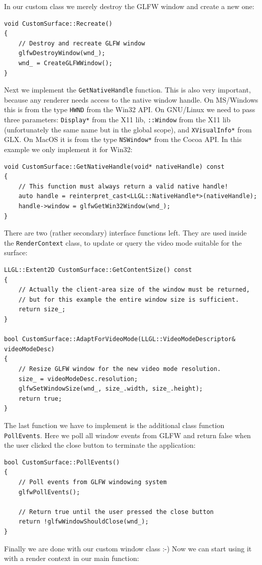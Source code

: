 \documentclass{article}
\begin{document}
In our custom class we merely destroy the GLFW window and create a new one:
\begin{lstlisting}
void CustomSurface::Recreate()
{
	// Destroy and recreate GLFW window
	glfwDestroyWindow(wnd_);
	wnd_ = CreateGLFWWindow();
}
\end{lstlisting}
Next we implement the \texttt{GetNativeHandle} function. This is also very important,
because any renderer needs access to the native window handle.
On MS/Windows this is from the type \texttt{HWND} from the Win32 API.
On GNU/Linux we need to pass three parameters: \texttt{Display*} from the X11 lib,
\texttt{::Window} from the X11 lib (unfortunately the same name but in the global scope),
and \texttt{XVisualInfo*} from GLX.
On MacOS it is from the type \texttt{NSWindow*} from the Cocoa API.
In this example we only implement it for Win32:
\begin{lstlisting}
void CustomSurface::GetNativeHandle(void* nativeHandle) const
{
	// This function must always return a valid native handle!
	auto handle = reinterpret_cast<LLGL::NativeHandle*>(nativeHandle);
	handle->window = glfwGetWin32Window(wnd_);
}
\end{lstlisting}
There are two (rather secondary) interface functions left.
They are used inside the \texttt{RenderContext} class, to update or query the video mode suitable for the surface:
\begin{lstlisting}
LLGL::Extent2D CustomSurface::GetContentSize() const
{
	// Actually the client-area size of the window must be returned,
	// but for this example the entire window size is sufficient.
	return size_;
}

bool CustomSurface::AdaptForVideoMode(LLGL::VideoModeDescriptor& videoModeDesc)
{
	// Resize GLFW window for the new video mode resolution.
	size_ = videoModeDesc.resolution;
	glfwSetWindowSize(wnd_, size_.width, size_.height);
	return true;
}
\end{lstlisting}
The last function we have to implement is the additional class function \texttt{PollEvents}.
Here we poll all window events from GLFW and return false when the user
clicked the close button to terminate the application:
\begin{lstlisting}
bool CustomSurface::PollEvents()
{
	// Poll events from GLFW windowing system
	glfwPollEvents();
	
	// Return true until the user pressed the close button
	return !glfwWindowShouldClose(wnd_);
}
\end{lstlisting}
Finally we are done with our custom window class :-) Now we can start using it with a render context in our main function:
\end{document}
